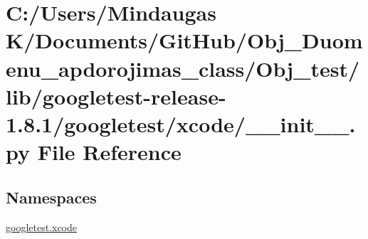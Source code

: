 \hypertarget{_obj__test_2lib_2googletest-release-1_88_81_2googletest_2xcode_2____init_____8py}{}\section{C\+:/\+Users/\+Mindaugas K/\+Documents/\+Git\+Hub/\+Obj\+\_\+\+Duomenu\+\_\+apdorojimas\+\_\+class/\+Obj\+\_\+test/lib/googletest-\/release-\/1.8.1/googletest/xcode/\+\_\+\+\_\+init\+\_\+\+\_\+.py File Reference}
\label{_obj__test_2lib_2googletest-release-1_88_81_2googletest_2xcode_2____init_____8py}
\subsection*{Namespaces}
\begin{DoxyCompactItemize}
\item 
 \mbox{\hyperlink{namespacegoogletest_1_1xcode}{googletest.\+xcode}}
\end{DoxyCompactItemize}
